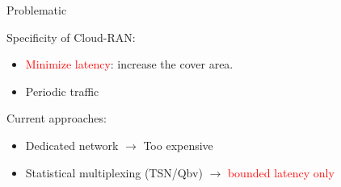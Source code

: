 \documentclass[10 pt]{beamer}
\begin{document}
\begin{frame}{Problematic}
  \centering
  
  
 \begin{multicols}{2}
Specificity of Cloud-RAN:
\vspace{1cm}
\begin{itemize}
\item \textcolor{red}{Minimize latency}: increase the cover area.
\item Periodic traffic 

\end{itemize}
\vspace{2cm}
Current approaches: \begin{itemize}
\vspace{1cm}
\item Dedicated network $\rightarrow$ Too expensive
\item Statistical multiplexing (TSN/Qbv) $\rightarrow$ \textcolor{red}{bounded latency only}
\end{itemize}
\end{multicols}

\end{frame}
\end{document}
